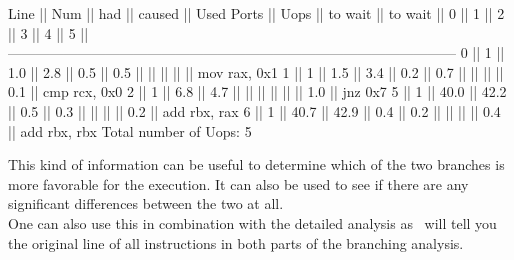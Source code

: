 \begin{example}
 Line  ||   Num   ||   had   || caused  ||            Used Ports
       ||   Uops  || to wait || to wait ||   0   ||   1   ||   2   ||   3   ||   4   ||   5   ||
 ------------------------------------------------------------------------------------------------
   0   ||    1    ||   1.0   ||   2.8   ||  0.5  ||  0.5  ||       ||       ||       ||       || mov rax, 0x1
   1   ||    1    ||   1.5   ||   3.4   ||  0.2  ||  0.7  ||       ||       ||       ||  0.1  || cmp rcx, 0x0
   2   ||    1    ||   6.8   ||   4.7   ||       ||       ||       ||       ||       ||  1.0  || jnz 0x7
   5   ||    1    ||  40.0   ||  42.2   ||  0.5  ||  0.3  ||       ||       ||       ||  0.2  || add rbx, rax
   6   ||    1    ||  40.7   ||  42.9   ||  0.4  ||  0.2  ||       ||       ||       ||  0.4  || add rbx, rbx
Total number of Uops: 5
\end{example}

This kind of information can be useful to determine which of the two branches is more favorable for the execution. It can also be used to see if there are any significant differences between the two at all.\\
One can also use this in combination with the detailed analysis as \suaca\ will tell you the original line of all instructions in both parts of the branching analysis.

\newpage
